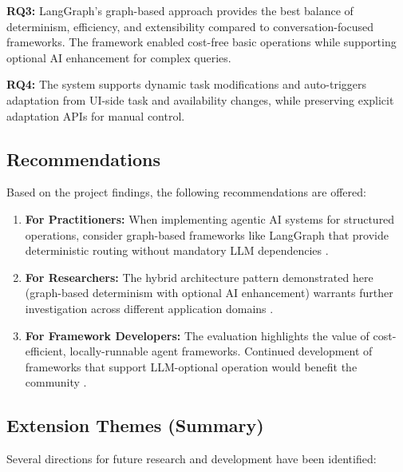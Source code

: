 \documentclass[12pt]{article}
\begin{document}
\textbf{RQ3:} LangGraph's graph-based approach provides the best balance of determinism, efficiency, and extensibility compared to conversation-focused frameworks. The framework enabled cost-free basic operations while supporting optional AI enhancement for complex queries.

\textbf{RQ4:} The system supports dynamic task modifications and auto-triggers adaptation from UI-side task and availability changes, while preserving explicit adaptation APIs for manual control.

\subsection{Recommendations}

Based on the project findings, the following recommendations are offered:

\begin{enumerate}
    \item \textbf{For Practitioners:} When implementing agentic AI systems for structured operations, consider graph-based frameworks like LangGraph that provide deterministic routing without mandatory LLM dependencies \parencite{langgraph2024}.
    
    \item \textbf{For Researchers:} The hybrid architecture pattern demonstrated here (graph-based determinism with optional AI enhancement) warrants further investigation across different application domains \parencite{bandi2025rise}.
    
    \item \textbf{For Framework Developers:} The evaluation highlights the value of cost-efficient, locally-runnable agent frameworks. Continued development of frameworks that support LLM-optional operation would benefit the community \parencite{langgraph2024}.
\end{enumerate}

\subsection{Extension Themes (Summary)}

Several directions for future research and development have been identified:
\end{document}
